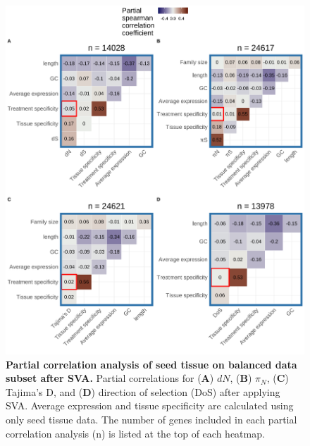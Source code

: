 \documentclass[12pt]{article}
\begin{document}
\begin{figure}[H]
\centering
\includegraphics[width = \linewidth]{figures/appendix_a/partialCorrelations_fullyBalancedSubset_seed_2023-02-22.pdf}
\caption{\textbf{Partial correlation analysis of seed tissue on balanced data subset after SVA.} Partial correlations for (\textbf{A}) $dN$, (\textbf{B}) $\pi_N$, (\textbf{C}) Tajima's D, and (\textbf{D}) direction of selection (DoS) after applying SVA. Average expression and tissue specificity are calculated using only seed tissue data. The number of genes included in each partial correlation analysis (n) is listed at the top of each heatmap.}%
\end{figure}
\end{document}
